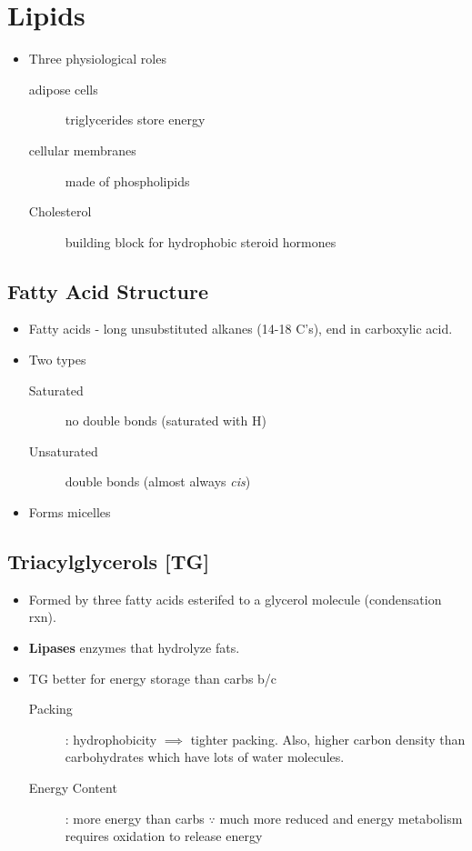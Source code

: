 \documentclass[../Bio_chemistryReview.tex]{subfiles}
\begin{document}
\section{Lipids}

\begin{itemize}
  \item Three physiological roles
    \begin{description}	
      \item[adipose cells] triglycerides store energy
      \item [cellular membranes] made of phospholipids
      \item[Cholesterol] building block for hydrophobic steroid hormones
    \end{description}
\end{itemize}

\subsection{Fatty Acid Structure}

\begin{itemize}
  \item Fatty acids - long unsubstituted alkanes (14-18 C's), end in carboxylic
    acid. 
  \item Two types
    \begin{description}
      \item[Saturated] no double bonds (saturated with H)
      \item[Unsaturated] double bonds (almost always \emph{cis})
    \end{description}
  \item Forms micelles
\end{itemize}

\subsection{Triacylglycerols [TG]}

\begin{itemize}
  \item Formed by three fatty acids esterifed to a glycerol molecule (condensation rxn).
  \item \textbf{Lipases} enzymes that hydrolyze fats.
  \item TG better for energy storage than carbs b/c
    \begin{description}
      \item[Packing]: hydrophobicity $\implies$ tighter packing. Also, higher
        carbon density than carbohydrates which have lots of water molecules.
      \item[Energy Content]: more energy than carbs $\because$ much more reduced
      and energy metabolism requires oxidation to release energy
    \end{description}
\end{itemize}
\end{document}
